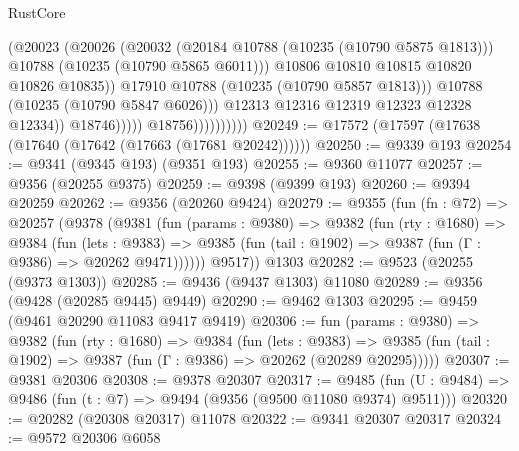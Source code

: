\begin{lexlean}{RustCore}
\begin{coremodule}
                                          (@20023
                                            (@20026
                                              (@20032
                                                (@20184 @10788 (@10235 (@10790 @5875 @1813)))
                                                @10788
                                                (@10235 (@10790 @5865 @6011)))
                                              @10806
                                              @10810
                                              @10815
                                              @10820
                                              @10826
                                              @10835))
                                          @17910
                                          @10788
                                          (@10235 (@10790 @5857 @1813)))
                                        @10788
                                        (@10235 (@10790 @5847 @6026)))
                                      @12313
                                      @12316
                                      @12319
                                      @12323
                                      @12328
                                      @12334))
                                  @18746)))))
                        @18756))))))))))
@20249 := @17572 (@17597 (@17638 (@17640 (@17642 (@17663 (@17681 @20242))))))
@20250 := @9339 @193
@20254 := @9341 (@9345 @193) (@9351 @193)
@20255 := @9360 @11077
@20257 := @9356 (@20255 @9375)
@20259 := @9398 (@9399 @193)
@20260 := @9394 @20259
@20262 := @9356 (@20260 @9424)
@20279 := @9355
    (fun (fn : @72) =>
    @20257
      (@9378
        (@9381
          (fun (params : @9380) =>
          @9382
            (fun (rty : @1680) =>
            @9384
              (fun (lets : @9383) =>
              @9385 (fun (tail : @1902) => @9387 (fun (Γ : @9386) => @20262 @9471))))))
        @9517))
    @1303
@20282 := @9523 (@20255 (@9373 @1303))
@20285 := @9436 (@9437 @1303) @11080
@20289 := @9356 (@9428 (@20285 @9445) @9449)
@20290 := @9462 @1303
@20295 := @9459 (@9461 @20290 @11083 @9417 @9419)
@20306 := fun (params : @9380) =>
  @9382
    (fun (rty : @1680) =>
    @9384
      (fun (lets : @9383) =>
      @9385 (fun (tail : @1902) => @9387 (fun (Γ : @9386) => @20262 (@20289 @20295)))))
@20307 := @9381 @20306
@20308 := @9378 @20307
@20317 := @9485
    (fun (U : @9484) => @9486 (fun (t : @7) => @9494 (@9356 (@9500 @11080 @9374) @9511)))
@20320 := @20282 (@20308 @20317) @11078
@20322 := @9341 @20307 @20317
@20324 := @9572 @20306 @6058

\end{coremodule}
\end{lexlean}
